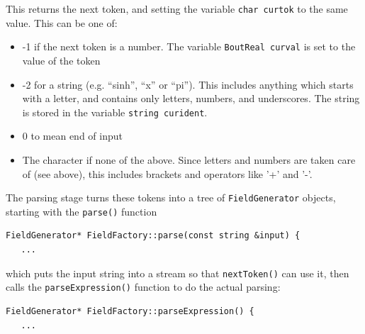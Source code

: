 \documentclass[12pt]{article}
\begin{document}
This returns the next token, and setting the variable \lstinline!char curtok! to the same value.
This can be one of:
\begin{itemize}
\item -1 if the next token is a number. The variable \lstinline!BoutReal curval! is set to
  the value of the token
\item -2 for a string (e.g. ``sinh'', ``x'' or ``pi''). This includes anything which starts with a letter, and
  contains only letters, numbers, and underscores. The string is stored in the variable \lstinline!string curident!.
\item 0 to mean end of input
\item The character if none of the above. Since letters and numbers are taken care of (see above), this includes
  brackets and operators like '+' and '-'.
\end{itemize}

The parsing stage turns these tokens into a tree of \lstinline!FieldGenerator! objects, starting
with the \lstinline!parse()! function
\begin{lstlisting}[firstnumber=484]
FieldGenerator* FieldFactory::parse(const string &input) {
   ...
\end{lstlisting}
which puts the input string into a stream so that \lstinline!nextToken()! can use it, then
calls the \lstinline!parseExpression()! function to do the actual parsing:
\begin{lstlisting}[firstnumber=477]
FieldGenerator* FieldFactory::parseExpression() {
   ...
\end{lstlisting}
\end{document}
